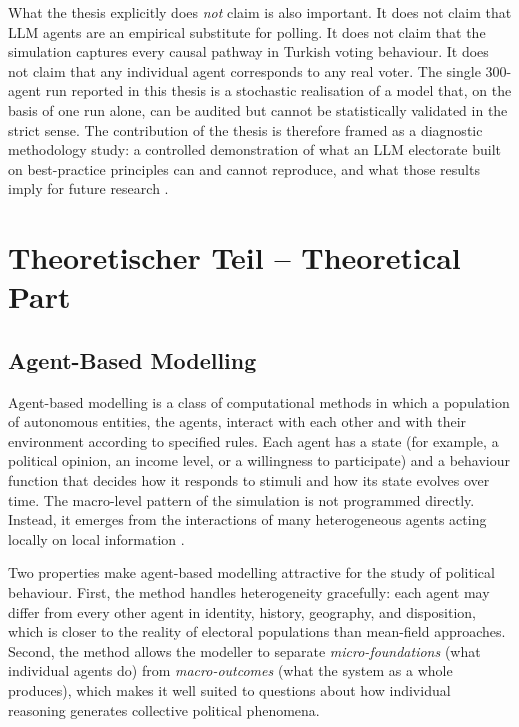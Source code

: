 \documentclass[12pt,a4paper]{report}
\begin{document}
What the thesis explicitly does \emph{not} claim is also important. It does not claim that LLM agents are an empirical substitute for polling. It does not claim that the simulation captures every causal pathway in Turkish voting behaviour. It does not claim that any individual agent corresponds to any real voter. The single 300-agent run reported in this thesis is a stochastic realisation of a model that, on the basis of one run alone, can be audited but cannot be statistically validated in the strict sense. The contribution of the thesis is therefore framed as a diagnostic methodology study: a controlled demonstration of what an LLM electorate built on best-practice principles can and cannot reproduce, and what those results imply for future research \citep{kreutner2026ep,qu2024performance}.

\chapter{Theoretischer Teil -- Theoretical Part}
\label{ch:theory}

\section{Agent-Based Modelling}
\label{sec:abm}

Agent-based modelling is a class of computational methods in which a population of autonomous entities, the agents, interact with each other and with their environment according to specified rules. Each agent has a state (for example, a political opinion, an income level, or a willingness to participate) and a behaviour function that decides how it responds to stimuli and how its state evolves over time. The macro-level pattern of the simulation is not programmed directly. Instead, it emerges from the interactions of many heterogeneous agents acting locally on local information \citep{epstein2006generative,macal2010tutorial}.

Two properties make agent-based modelling attractive for the study of political behaviour. First, the method handles heterogeneity gracefully: each agent may differ from every other agent in identity, history, geography, and disposition, which is closer to the reality of electoral populations than mean-field approaches. Second, the method allows the modeller to separate \emph{micro-foundations} (what individual agents do) from \emph{macro-outcomes} (what the system as a whole produces), which makes it well suited to questions about how individual reasoning generates collective political phenomena.
\end{document}
